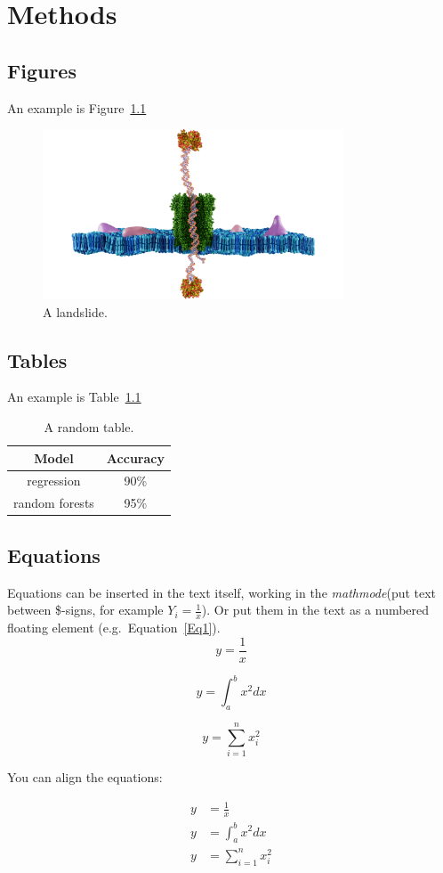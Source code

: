 \chapter{Methods}

\section{Figures}
An example is Figure~\ref{Landslide}
\begin{figure}[h] %
    \centering %
    \includegraphics[width=0.8\textwidth]{Figures/CoverPhoto.png}
    \caption{A landslide.}
    \label{Landslide}
\end{figure}

\newpage

\section{Tables}
An example is Table~\ref{Tabel1}
\begin{table}[h]
    \centering
    \begin{tabular}{|c|c|}
        \hline
       Model  &  Accuracy  \\ \hline
        regression & 90\%                \\ \hline
        random forests & 95\%           \\ \hline
    \end{tabular}
    \caption{A random table.}
    \label{Tabel1}
\end{table}

\newpage

\section{Equations}
Equations can be inserted in the text itself, working in the \textit{mathmode}(put text between \$-signs, for example $Y_i=\frac{1}{x}$). Or put them in the text as a numbered floating element (e.g.\ Equation~\eqref{Eq1}).
\begin{equation}\label{Eq1}
    y=\frac{1}{x}
\end{equation}

\begin{equation}
    y=\int_{a}^{b} x^2 dx
\end{equation}

\begin{equation}
    y=\sum_{i=1}^{n} x_i^2
\end{equation}

You can align the equations:

\begin{align}
    y &=\frac{1}{x} \\
    y &=\int_{a}^{b} x^2 dx \\
    y &=\sum_{i=1}^{n} x_i^2
\end{align}
